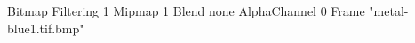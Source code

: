 {Bitmap
	{Filtering 1}
	{Mipmap 1}
	{Blend none}
	{AlphaChannel 0}
	{Frame "metal-blue1.tif.bmp"}
}
